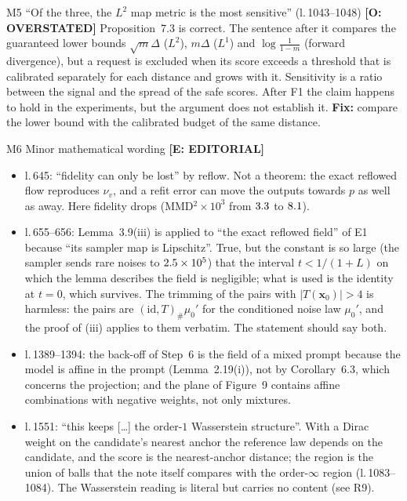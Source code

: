 \documentclass[11pt]{article}
\newcommand{\bx}{\mathbf{x}}
\newcommand{\lin}[1]{l.\,#1}
\newcommand{\badge}[2]{\textcolor{#1}{\textbf{[#2]}}}
\newcommand{\Sover}{\badge{warnOr}{O: OVERSTATED}}
\newcommand{\Sedit}{\badge{greyed}{E: EDITORIAL}}
\begin{document}
\begin{findbox}{M5 \quad ``Of the three, the $L^2$ map metric is the most sensitive'' (\lin{1043--1048}) \hfill \Sover}
Proposition~7.3 is correct. The sentence after it compares the guaranteed lower bounds $\sqrt m\Delta$ ($L^2$), $m\Delta$ ($L^1$) and
$\log\frac1{1-m}$ (forward divergence), but a request is excluded when its score exceeds a threshold that is calibrated separately
for each distance and grows with it. Sensitivity is a ratio between the signal and the spread of the safe scores. After F1 the
claim happens to hold in the experiments, but the argument does not establish it. \textbf{Fix:} compare the lower bound with the
calibrated budget of the same distance.
\end{findbox}

\begin{findbox}{M6 \quad Minor mathematical wording \hfill \Sedit}
\begin{itemize}[leftmargin=1.3em,itemsep=1pt,topsep=2pt]
\item \lin{645}: ``fidelity can only be lost'' by reflow. Not a theorem: the exact reflowed flow reproduces $\nu_v$, and a refit error
can move the outputs towards $p$ as well as away. Here fidelity drops (MMD$^2\times10^3$ from $3.3$ to $8.1$).
\item \lin{655--656}: Lemma~3.9(iii) is applied to ``the exact reflowed field'' of E1 because ``its sampler map is Lipschitz''.
True, but the constant is so large (the sampler sends rare noises to $2.5\times10^{5}$) that the interval $t<1/(1+L)$ on which the lemma
describes the field is negligible; what is used is the identity at $t=0$, which survives. The trimming of the pairs with
$|T(\bx_0)|>4$ is harmless: the pairs are $(\mathrm{id},T)_\#\mu_0'$ for the conditioned noise law $\mu_0'$, and the proof of (iii) applies
to them verbatim. The statement should say both.
\item \lin{1389--1394}: the back-off of Step~6 is the field of a mixed prompt because the model is affine in the prompt
(Lemma~2.19(i)), not by Corollary~6.3, which concerns the projection; and the plane of Figure~9 contains affine combinations with
negative weights, not only mixtures.
\item \lin{1551}: ``this keeps [\dots] the order-$1$ Wasserstein structure''. With a Dirac weight on the candidate's nearest anchor the
reference law depends on the candidate, and the score is the nearest-anchor distance; the region is the union of balls that the note
itself compares with the order-$\infty$ region (\lin{1083--1084}). The Wasserstein reading is literal but carries no content (see R9).
\end{itemize}
\end{findbox}
\end{document}
